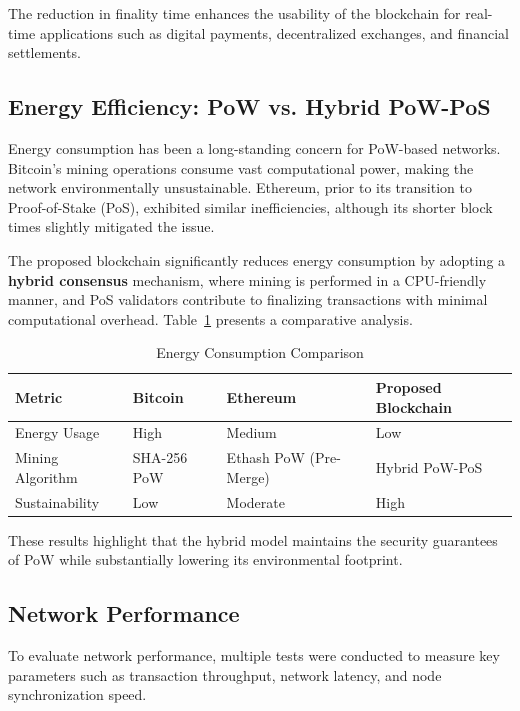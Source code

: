 \documentclass[conference]{IEEEtran}
\begin{document}
The reduction in finality time enhances the usability of the blockchain for real-time applications such as digital payments, decentralized exchanges, and financial settlements.

\subsection{Energy Efficiency: PoW vs. Hybrid PoW-PoS}
Energy consumption has been a long-standing concern for PoW-based networks. Bitcoin's mining operations consume vast computational power, making the network environmentally unsustainable. Ethereum, prior to its transition to Proof-of-Stake (PoS), exhibited similar inefficiencies, although its shorter block times slightly mitigated the issue.

The proposed blockchain significantly reduces energy consumption by adopting a \textbf{hybrid consensus} mechanism, where mining is performed in a CPU-friendly manner, and PoS validators contribute to finalizing transactions with minimal computational overhead. Table~\ref{tab:energy} presents a comparative analysis.

\begin{table}[h]
    \centering
    \caption{Energy Consumption Comparison}
    \label{tab:energy}
    \begin{tabularx}{\linewidth}{|X|X|X|X|}
        \hline
        \textbf{Metric} & \textbf{Bitcoin} & \textbf{Ethereum} & \textbf{Proposed Blockchain} \\
        \hline
        Energy Usage & High & Medium & Low \\
        \hline
        Mining Algorithm & SHA-256 PoW & Ethash PoW (Pre-Merge) & Hybrid PoW-PoS \\
        \hline
        Sustainability & Low & Moderate & High \\
        \hline
    \end{tabularx}
\end{table}

These results highlight that the hybrid model maintains the security guarantees of PoW while substantially lowering its environmental footprint.

\subsection{Network Performance}
To evaluate network performance, multiple tests were conducted to measure key parameters such as transaction throughput, network latency, and node synchronization speed.
\end{document}
